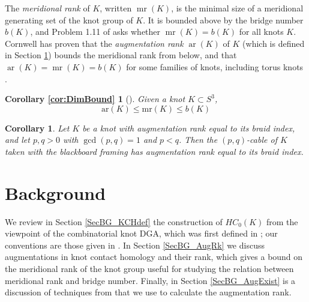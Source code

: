 \documentclass[11pt]{amsart}
\def\C{{\mathbb C}}
\def\A{{\mathcal A}}
\def\ar{\operatorname{ar}}
\def\mr{\operatorname{mr}}
\newtheorem{cor}[thm]{Corollary}
\begin{document}
The \emph{meridional rank} of $K$, written $\mr(K)$, is the minimal size of a meridional generating set of the knot group of $K$.  It is bounded above by the bridge number $b(K)$, and Problem 1.11 of \cite{Kir95} asks whether $\mr(K) = b(K)$ for all knots $K$.  Cornwell has proven that the \emph{augmentation rank} $\ar(K)$ of $K$ (which is defined in Section \ref{SecBG}) bounds the meridional rank from below, and that $\ar(K) = \mr(K) = b(K)$ for some families of knots, including torus knots \cite{Cor13b}.


\newtheorem*{cor:DimBound}{Corollary \ref{cor:DimBound}}
\begin{cor:DimBound}[\cite{Cor13b}] Given a knot $K\subset S^3$,
$$\text{ar}(K)\le\text{mr}(K)\le b(K)$$
\end{cor:DimBound}






\begin{cor}
Let $K$ be a knot with augmentation rank equal to its braid index, and let $p,q>0$ with $\gcd(p,q) = 1$ and $p<q$.  Then the $(p,q)$-cable of $K$ taken with the blackboard framing has augmentation rank equal to its braid index.
\end{cor}






\section{Background}
\label{SecBG}

  We review in Section \ref{SecBG_KCHdef} the construction of $HC_0(K)$ from the viewpoint of the combinatorial knot DGA, which was first defined in \cite{Ng08}; our conventions are those given in \cite{Ng12}. In Section \ref{SecBG_AugRk} we discuss augmentations in knot contact homology and their rank, which gives a bound on the meridional rank of the knot group useful for studying the relation between meridional rank and bridge number. Finally, in Section \ref{SecBG_AugExist} is a discussion of techniques from \cite{Cor13a} that we use to calculate the augmentation rank.
\end{document}
